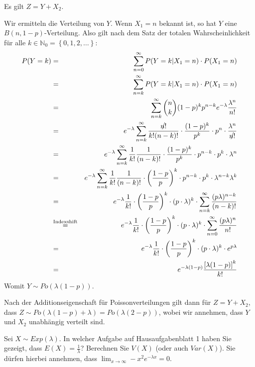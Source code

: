 \begin{Answer}
	\Question Es gilt $Z=Y+X_2$.
	
	\Question
	Wir ermitteln die Verteilung von $Y$. Wenn $X_1=n$ bekannt ist, so hat $Y$ eine $B(n,1-p)$-Verteilung. Also gilt nach dem Satz der totalen Wahrscheinlichkeit für alle $k\in\mathbb{N}_0=\left\lbrace0,1,2,\dots\right\rbrace$:
	\begin{eqnarray*}
		P(Y=k)&=&\sum_{n=0}^\infty P(Y=k\vert X_1=n)\cdot P(X_1=n)\\
		&=&\sum_{n=k}^\infty P(Y=k\vert X_1=n)\cdot P(X_1=n)\\
		&=&\sum_{n=k}^\infty \binom{n}{k}(1-p)^kp^{n-k}e^{-\lambda}\frac{\lambda^n}{n!}\\
		&=&e^{-\lambda}\sum_{n=k}^\infty\frac{\slashed{n!}}{k!(n-k)!}\cdot\frac{(1-p)^k}{p^k}\cdot p^n\cdot \frac{\lambda^n}{\slashed{n!}}\\
		&=&e^{-\lambda}\sum_{n=k}^\infty\frac{1}{k!}\frac{1}{(n-k)!}\cdot\frac{(1-p)^k}{p^k}\cdot p^{n-k}\cdot p^k\cdot \lambda^n\\
		&=&e^{-\lambda}\sum_{n=k}^\infty\frac{1}{k!}\frac{1}{(n-k)!}\cdot\left(\frac{1-p}{p}\right)^k\cdot p^{n-k}\cdot p^k\cdot \lambda^{n-k}\lambda^k\\
		&=&e^{-\lambda}\frac{1}{k!}\cdot\left(\frac{1-p}{p}\right)^k\cdot (p\cdot\lambda)^k\cdot \sum_{n=k}^\infty\frac{(p\lambda)^{n-k}}{(n-k)!}\\
		&\stackrel{\text{Indexshift}}{=}&e^{-\lambda}\frac{1}{k!}\cdot\left(\frac{1-p}{p}\right)^k\cdot (p\cdot\lambda)^k\cdot \sum_{n=0}^\infty\frac{(p\lambda)^{n}}{n!}\\
		&=&e^{-\lambda}\frac{1}{k!}\cdot\left(\frac{1-p}{p}\right)^k\cdot (p\cdot\lambda)^k\cdot e^{p\lambda}\\
		&=&e^{-\lambda(1-p)}\frac{\left[\lambda(1-p)\right]^k}{k!}
	\end{eqnarray*}
	Womit $Y\sim Po(\lambda(1-p))$. 
	
	\Question Nach der Additionseigenschaft für Poissonverteilungen gilt dann für $Z=Y+X_2$, dass $Z\sim Po(\lambda(1-p)+\lambda)=Po(\lambda(2-p))$, wobei wir annehmen, dass $Y$ und $X_2$ unabhängig verteilt sind.
\end{Answer}

\begin{Exercise}
	Sei $X\sim Exp(\lambda)$. 
	\Question In welcher Aufgabe auf Hausaufgabenblatt 1 haben Sie gezeigt, dass $E(X)=\frac{1}{\lambda}$?
	\Question Berechnen Sie $V(X)$ (oder auch $Var(X)$). Sie dürfen hierbei annehmen, dass $\lim_{x\to\infty} -x^2e^{-\lambda x}=0$.
\end{Exercise}
	
